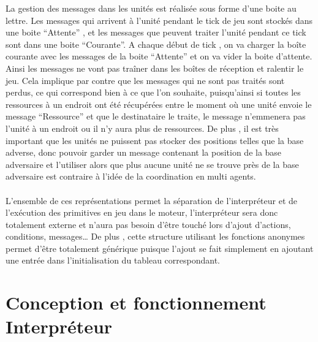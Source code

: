 \documentclass{report}
\begin{document}
La gestion des messages dans les unités est réalisée sous forme d’une boite au lettre. Les messages qui arrivent à l’unité pendant le tick  de jeu sont stockés dans une boite “Attente” , et les messages que peuvent traiter l’unité pendant ce tick sont dans une boite “Courante”. A chaque début de tick , on va charger la boîte courante avec les messages de la boite “Attente” et on va vider la boite d’attente. Ainsi les messages ne vont pas traîner dans les boîtes de réception et ralentir le jeu. Cela implique par contre que les messages qui ne sont pas traités sont perdus, ce qui correspond bien à ce que l’on souhaite, puisqu’ainsi si toutes les ressources à un endroit ont été récupérées entre le moment où une unité envoie le message “Ressource” et que le destinataire le traite, le message n’emmenera pas l’unité à un endroit ou il n’y aura plus de ressources. De plus , il est très important que les unités ne puissent pas stocker des positions telles que la base adverse, donc pouvoir garder un message contenant la position de la base adversaire et l’utiliser alors que plus aucune unité ne se trouve près de la base adversaire est contraire à l’idée de la coordination en multi agents.
\paragraph{}

L’ensemble de ces représentations permet la séparation de l’interpréteur et de l'exécution des primitives en jeu dans le moteur, l’interpréteur sera donc totalement externe et n’aura pas besoin d’être touché lors d’ajout d’actions, conditions, messages…
De plus , cette structure utilisant les fonctions anonymes permet d'être totalement générique puisque l’ajout se fait simplement en ajoutant une entrée dans l’initialisation du tableau correspondant.
\paragraph{}



\paragraph{}
\newpage

\section{Conception et fonctionnement Interpréteur}
\paragraph{}
\end{document}
